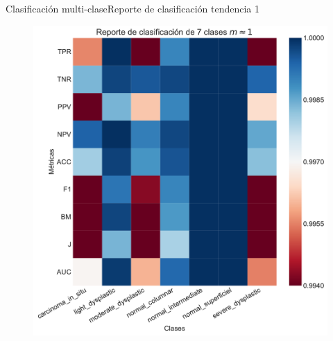 \documentclass{beamer}
\begin{document}
    \begin{frame}{Clasificación multi-clase}{Reporte de clasificación tendencia 1}
        \begin{figure}[]
            \centering
            \includegraphics[height=0.95\textheight]{reporte_7_class/reporte_uno.pdf}
        \end{figure}
    \end{frame}

\end{document}
